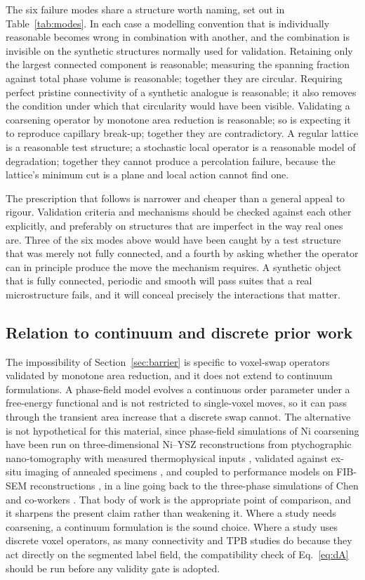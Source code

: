\documentclass[5p,times,twocolumn]{elsarticle}
\begin{document}
The six failure modes share a structure worth naming, set out in
Table~\ref{tab:modes}. In each case a modelling
convention that is individually reasonable becomes wrong in combination with
another, and the combination is invisible on the synthetic structures normally
used for validation. Retaining only the largest connected component is
reasonable; measuring the spanning fraction against total phase volume is
reasonable; together they are circular. Requiring perfect pristine
connectivity of a synthetic analogue is reasonable; it also removes the
condition under which that circularity would have been visible. Validating a
coarsening operator by monotone area reduction is reasonable; so is expecting
it to reproduce capillary break-up; together they are contradictory. A regular
lattice is a reasonable test structure; a stochastic local operator is a
reasonable model of degradation; together they cannot produce a percolation
failure, because the lattice's minimum cut is a plane and local action cannot
find one.

The prescription that follows is narrower and cheaper than a general appeal to
rigour. Validation criteria and mechanisms should be checked
against each other explicitly, and preferably on structures that are imperfect
in the way real ones are. Three of the six modes above would have been caught
by a test structure that was merely not fully connected, and a fourth
by asking whether the operator can in principle produce the move the mechanism
requires. A synthetic object that is fully connected, periodic and smooth will
pass suites that a real microstructure fails, and it will conceal precisely
the interactions that matter.

\subsection{Relation to continuum and discrete prior work}

The impossibility of Section~\ref{sec:barrier} is specific to voxel-swap
operators validated by monotone area reduction, and it does not extend to
continuum formulations. A phase-field model evolves a continuous order
parameter under a free-energy functional and is not restricted to single-voxel
moves, so it can pass through the transient area increase that a discrete swap
cannot. The alternative is not hypothetical for this material, since
phase-field
simulations of Ni coarsening have been run on three-dimensional Ni--YSZ
reconstructions from ptychographic nano-tomography with measured
thermophysical inputs \cite{yang2023}, validated against ex-situ imaging of
annealed specimens \cite{trini2021}, and coupled to performance models on
FIB-SEM reconstructions \cite{hoffrogge2023}, in a line going back to the
three-phase simulations of Chen and co-workers \cite{chen2011}. That body of
work is the appropriate point of comparison, and it sharpens the present claim
rather than weakening it. Where a study needs coarsening, a continuum
formulation is the sound choice. Where a study uses discrete voxel operators,
as many connectivity and TPB studies do because they act directly on the
segmented label field, the compatibility check of Eq.~\eqref{eq:dA} should be
run before any validity gate is adopted.
\end{document}
